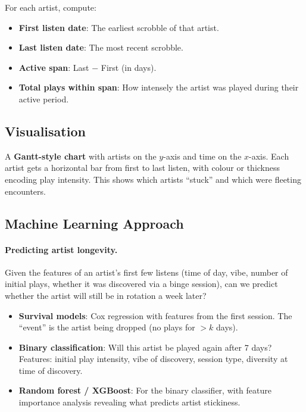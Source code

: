 \documentclass[12pt, a4paper]{article}
\begin{document}
For each artist, compute:
\begin{itemize}
    \item \textbf{First listen date}: The earliest scrobble of that artist.
    \item \textbf{Last listen date}: The most recent scrobble.
    \item \textbf{Active span}: Last $-$ First (in days).
    \item \textbf{Total plays within span}: How intensely the artist was
          played during their active period.
\end{itemize}

\subsection{Visualisation}

A \textbf{Gantt-style chart} with artists on the $y$-axis and time on the
$x$-axis. Each artist gets a horizontal bar from first to last listen, with
colour or thickness encoding play intensity. This shows which artists
``stuck'' and which were fleeting encounters.

\subsection{Machine Learning Approach}

\paragraph{Predicting artist longevity.}
Given the features of an artist's first few listens (time of day, vibe,
number of initial plays, whether it was discovered via a binge session),
can we predict whether the artist will still be in rotation a week later?

\begin{itemize}
    \item \textbf{Survival models}: Cox regression with features from the
          first session. The ``event'' is the artist being dropped (no plays
          for $> k$ days).
    \item \textbf{Binary classification}: Will this artist be played again
          after 7 days? Features: initial play intensity, vibe of discovery,
          session type, diversity at time of discovery.
    \item \textbf{Random forest / XGBoost}: For the binary classifier, with
          feature importance analysis revealing what predicts artist
          stickiness.
\end{itemize}
\end{document}
